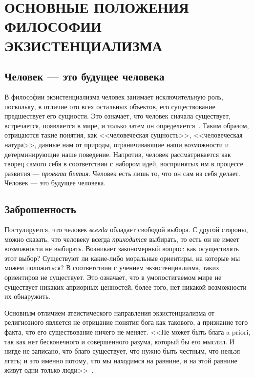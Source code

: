 \section[Основные положения философии экзистенциализма]{%
    ОСНОВНЫЕ ПОЛОЖЕНИЯ ФИЛОСОФИИ \\
    ЭКЗИСТЕНЦИАЛИЗМА
}

\subsection{Человек --- это будущее человека}

В философии экзистенциализма человек занимает исключительную роль,
поскольку, в отличие ото всех остальных объектов,
его существование предшествует его сущности.
Это означает, что человек сначала существует, встречается,
появляется в мире, и только затем он определяется~\cite{sartr_exist_human}.
Таким образом, отрицаются такие понятия, как <<человеческая сущность>>,
<<человеческая натура>>, данные нам от природы,
ограничивающие наши возможности и детерминирующие наше поведение.
Напротив, человек рассматривается как творец самого себя
в соответствии с набором идей, воспринятых им в процессе
развития --- \emph{проекта бытия}.
Человек есть лишь то, что он сам из себя делает.
Человек --- это будущее человека.

\subsection{Заброшенность}

Постулируется, что человек \emph{всегда}
обладает свободой выбора. С другой стороны, можно сказать, что человеку всегда
\emph{приходится} выбирать, то есть он не имеет возможности не выбирать.
Возникает закономерный вопрос: как осуществлять этот выбор?
Существуют ли какие-либо моральные ориентиры,
на которые мы можем положиться?
В соответствии с учением экзистенциализма, таких ориентиров не существует.
Это означает, что в умопостигаемом мире не существует никаких априорных ценностей,
более того, нет никакой возможности их обнаружить.

Основным отличием атеистического направления экзистенциализма от религиозного является
не отрицание понятия бога как такового, а признание того факта,
что его существование ничего не меняет.
<<Не может быть блага a priori, так как нет бесконечного и совершенного разума,
который бы его мыслил. И нигде не записано, что благо существует, что нужно быть честным,
что нельзя лгать; и это именно потому, что мы находимся на равнине, и на этой равнине
живут одни только люди>>~\cite{sartr_exist_human}.

